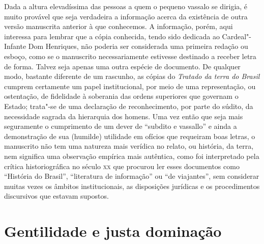Dada a altura elevadíssima das pessoas a quem o pequeno vassalo se
dirigia, é muito provável que seja verdadeira a informação acerca da
existência de outra versão manuscrita anterior à que conhecemos. A
informação, porém, aqui interessa para lembrar que a cópia conhecida,
tendo sido dedicada ao Cardeal"-Infante Dom Henriques, não poderia ser
considerada uma primeira redação ou esboço, como se o manuscrito
necessariamente estivesse destinado a receber letra de forma. Talvez
seja apenas uma outra espécie de documento. De qualquer modo, bastante
diferente de um rascunho, as cópias do \textit{Tratado da terra do Brasil}
cumprem certamente um papel institucional, por meio de uma
representação, ou ostentação, de fidelidade à soberania das ordens
superiores que governam o Estado; trata"-se de uma declaração de
reconhecimento, por parte do súdito, da necessidade sagrada da
hierarquia dos homens. Uma vez então que seja mais seguramente o
cumprimento de um dever de ``subdito e vassallo'' e ainda a demonstração de sua (humilde)
utilidade em ofícios que requeiram boas letras, o manuscrito não tem
uma natureza mais verídica no relato, ou história, da terra, nem
significa uma observação empírica mais autêntica, como foi interpretado
pela crítica historiográfica no século \textsc{xx} que procurou ler esses
documentos como ``História do Brasil'', ``literatura de informação'' ou
``de viajantes'', sem considerar muitas vezes os âmbitos institucionais, 
as disposições jurídicas e os procedimentos discursivos que estavam supostos.


\section*{Gentilidade e justa dominação}

